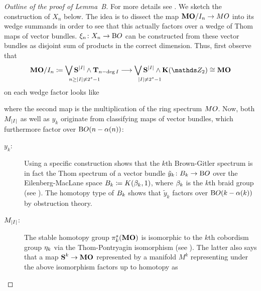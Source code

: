 \begin{proof}[Outline of the proof of Lemma~B]
  For more details see \cite[Chap.~III, §2]{immersionconj}.
  We sketch the construction of $X_n$ below.
  The idea is to dissect the map $\bm{\mathrm{MO}}/I_{n}\to MO$ into its
  wedge summands in order to see that this actually factors over a
  wedge of Thom maps of vector bundles.
  $\xi_n\colon X_n\to\mathrm{B}O$ can be constructed from these vector bundles
  as disjoint sum of products in the correct dimension.
  Thus, first observe that
  \begin{gather*}
    \MOmodI n
    \coloneqq
    \bigvee_{\mathrlap{n\geq\Deg{I}\neq 2^s-1}}
    \Spherespec{\Deg{I}} \smashprod \BrownGitler{n-\deg{I}}
    \longto
    \bigvee_{\mathrlap{\Deg{I}\neq 2^s-1}}
    \Spherespec{\Deg{I}} \smashprod  \EMspec
    \cong
    \MOspec
  \end{gather*}
  on each wedge factor looks like
  \begin{center}
  \end{center}
  where the second map is the multiplication of the ring spectrum
  $MO$.
  Now, both $M_{\left|I\right|}$ as well as $y_k$ originate
  from classifying maps of vector bundles, which furthermore factor
  over $\mathrm{B}O(n-\alpha(n))$:
  \begin{description}
  \item[$y_k$:]
    Using a specific construction shows that
    the $k$th Brown-Gitler spectrum is in fact the Thom spectrum of a
    vector bundle $\tilde y_k\colon B_{k}\to\mathrm{B}O$ over the
    Eilenberg-MacLane space $B_{k}\coloneqq K(\beta_{k},1)$,
    where $\beta_{k}$ is the $k$th braid group
    (see \cite[Chap.~II, §2]{immersionconj}).
    The homotopy type of $B_{k}$ shows that $\tilde y_k$
    factors over $\mathrm{B}O(k-\alpha(k))$ by obstruction theory.
  \item[$M_{\left|I\right|}$:]
    The stable homotopy group $\pi_k^s(\bm{\mathrm{MO}})$ is isomorphic
    to the $k$th cobordism group $\eta_k$
    via the Thom-Pontryagin isomorphism (see \cite[Chap.~II]{stong}).
    The latter also says that a map $\bm{\mathrm{S}}^{k}\to\bm{\mathrm{MO}}$
    represented by a manifold $M^k$ representing under the above
    isomorphism factors up to homotopy as

\end{description}
\end{proof}
